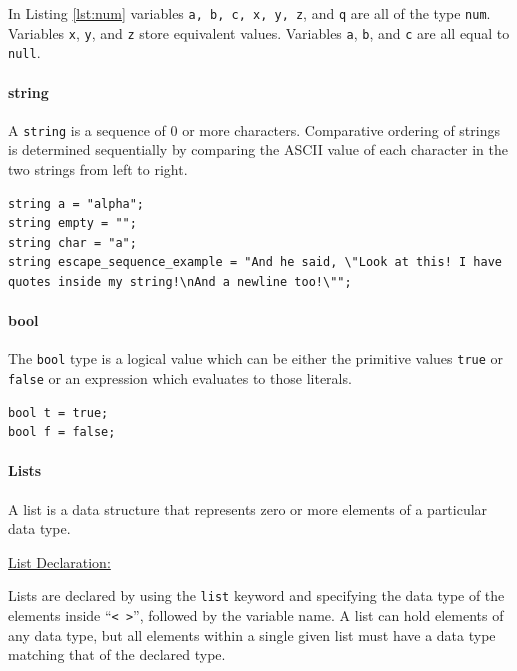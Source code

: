 \documentclass{article}
\newcommand{\code}[1]{\texttt{#1}} %
\begin{document}
In Listing \ref{lst:num} variables \code{a, b, c, x, y, z}, and \code{q} are all of the type \code{num}. Variables \code{x}, \code{y}, and \code{z} store equivalent values. Variables \code{a}, \code{b}, and \code{c} are all equal to \code{null}.

\paragraph{string}

A \code{string} is a sequence of 0 or more characters. Comparative ordering of strings is determined sequentially by comparing the ASCII value of each character in the two strings from left to right.

\begin{lstlisting}[language=pltLang, caption=Declaration of ``string'' types., label=lst:string]
string a = "alpha";
string empty = "";
string char = "a";
string escape_sequence_example = "And he said, \"Look at this! I have quotes inside my string!\nAnd a newline too!\"";
\end{lstlisting}

\paragraph{bool}

The \code{bool} type is a logical value which can be either the primitive values \code{true} or \code{false} or an expression which evaluates to those literals.

\begin{lstlisting}[language=pltLang, caption=Declaration of ``bool'' types., label=lst:bool]
bool t = true;
bool f = false;
\end{lstlisting}


\paragraph{Lists}

A list is a data structure that represents zero or more elements of a particular data type. 

\underline{List Declaration:}

Lists are declared by using the \code{list} keyword and specifying the data type of the elements inside ``\code{< >}'', followed by the variable name. A list can hold elements of any data type, but all elements within a single given list must have a data type matching that of the declared type. 
\end{document}
